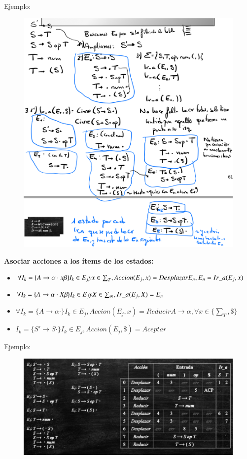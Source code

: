 \documentclass[12pt, twoside, openright]{report} %
\begin{document}
Ejemplo: 
\begin{figure}[H]
  {\includegraphics[scale=.3]{2021-03-26 19_23_58-ASintactico.pdf - Foxit Reader.png}}
\end{figure}
\pagebreak
\textbf{Asociar acciones a los ítems de los estados:}
\begin{itemize}
  \item $\forall I_k = \{ A \rightarrow \alpha \cdot x \beta\} I_k \in E_j \space y \space x\in \sum_T, Accion(E_j, x)=Desplazar E_n, E_n = Ir\_a(E_j,x)$
  \item $\forall I_k = \{ A \rightarrow \alpha \cdot X \beta\} I_k \in E_j \space y \space X\in \sum_N, Ir\_a(E_j,X) = E_n$
  \item $\forall I_k = \{ A \rightarrow \alpha \cdot \} I_k \in E_j, Accion(E_j, x)= Reducir A \rightarrow \alpha, \forall x \in \{ \sum_T, \$ \}$
  \item $I_k = \{ S' \rightarrow S \cdot \} I_k \in E_j, Accion(E_j, \$)= Aceptar$
\end{itemize}

Ejemplo: 
\begin{figure}[H]
  {\includegraphics[scale=.35]{2021-03-26 19_51_21-ASintactico.pdf - Foxit Reader.png}}
\end{figure}
\end{document}
